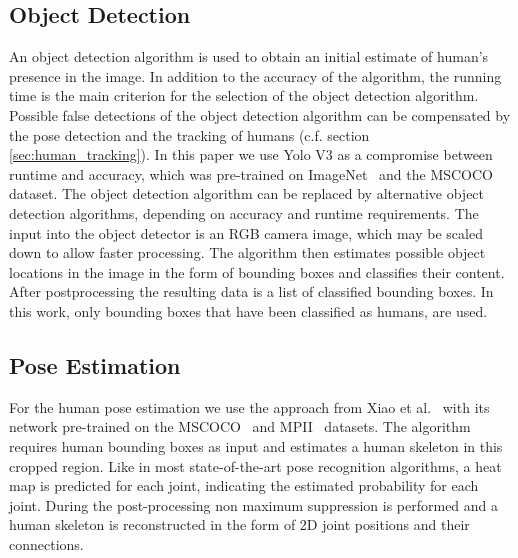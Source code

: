 \documentclass[a4paper, 10pt, conference]{ieeeconf}
\begin{document}
\subsection{Object Detection}
\label{sec:object_detection}
An object detection algorithm is used to obtain an initial estimate of human's presence in the image. In addition to the accuracy of the algorithm, the running time is the main criterion for the selection of the object detection algorithm. Possible false detections of the object detection algorithm can be compensated by the pose detection and the tracking of humans (c.f. section \ref{sec:human_tracking}). In this paper we use Yolo V3 \cite{redmonYOLOv3IncrementalImprovement2018} as a compromise between runtime and accuracy, which was pre-trained on ImageNet~\cite{dengImageNetLargescaleHierarchical2009} and the MSCOCO~\cite{linMicrosoftCOCOCommon2014} dataset. The object detection algorithm can be replaced by alternative object detection algorithms, depending on accuracy and runtime requirements. The input into the object detector is an RGB camera image, which may be scaled down to allow faster processing. The algorithm then estimates possible object locations in the image in the form of bounding boxes and classifies their content. After postprocessing the resulting data is a list of classified bounding boxes. In this work, only bounding boxes that have been classified as humans, are used.

\subsection{Pose Estimation}
\label{sec:pose_estimation}
For the human pose estimation we use the approach from Xiao et al.~\cite{xiaoSimpleBaselinesHuman2018} with its network pre-trained on the MSCOCO~\cite{linMicrosoftCOCOCommon2014} and MPII~\cite{andriluka2DHumanPose2014} datasets. The algorithm requires human bounding boxes as input and estimates a human skeleton in this cropped region. Like in most state-of-the-art pose recognition algorithms, a heat map is predicted for each joint, indicating the estimated probability for each joint. During the post-processing non maximum suppression is performed and a human skeleton is reconstructed in the form of 2D joint positions and their connections.
\end{document}
